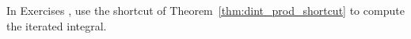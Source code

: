 {\noindent In Exercises}
{, use the shortcut of Theorem~\ref{thm:dint_prod_shortcut} to compute the iterated integral.}
